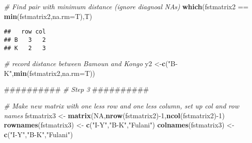 \documentclass[]{article}
\newenvironment{Shaded}{\begin{snugshade}}{\end{snugshade}}
\newcommand{\KeywordTok}[1]{\textcolor[rgb]{0.13,0.29,0.53}{\textbf{{#1}}}}
\newcommand{\DataTypeTok}[1]{\textcolor[rgb]{0.13,0.29,0.53}{{#1}}}
\newcommand{\DecValTok}[1]{\textcolor[rgb]{0.00,0.00,0.81}{{#1}}}
\newcommand{\StringTok}[1]{\textcolor[rgb]{0.31,0.60,0.02}{{#1}}}
\newcommand{\CommentTok}[1]{\textcolor[rgb]{0.56,0.35,0.01}{\textit{{#1}}}}
\newcommand{\OtherTok}[1]{\textcolor[rgb]{0.56,0.35,0.01}{{#1}}}
\newcommand{\NormalTok}[1]{{#1}}
\begin{document}
\begin{Shaded}
\begin{Highlighting}[]
\CommentTok{# Find pair with minimum distance (ignore diagnoal NAs)}
\KeywordTok{which}\NormalTok{(fstmatrix2 ==}\StringTok{ }\KeywordTok{min}\NormalTok{(fstmatrix2,}\DataTypeTok{na.rm=}\NormalTok{T),T)}
\end{Highlighting}
\end{Shaded}

\begin{verbatim}
##   row col
## B   3   2
## K   2   3
\end{verbatim}

\begin{Shaded}
\begin{Highlighting}[]
\CommentTok{# record distance between Bamoun and Kongo}
\NormalTok{y2 <-}\KeywordTok{c}\NormalTok{(}\StringTok{"B-K"}\NormalTok{,}\KeywordTok{min}\NormalTok{(fstmatrix2,}\DataTypeTok{na.rm=}\NormalTok{T))}

\NormalTok{##########}
\CommentTok{# Step 3}
\NormalTok{##########}

\CommentTok{# Make new matrix with one less row and one less column, set up col and row names}
\NormalTok{fstmatrix3 <-}\StringTok{ }\KeywordTok{matrix}\NormalTok{(}\OtherTok{NA}\NormalTok{,}\KeywordTok{nrow}\NormalTok{(fstmatrix2)-}\DecValTok{1}\NormalTok{,}\KeywordTok{ncol}\NormalTok{(fstmatrix2)-}\DecValTok{1}\NormalTok{)}
\KeywordTok{rownames}\NormalTok{(fstmatrix3) <-}\StringTok{ }\KeywordTok{c}\NormalTok{(}\StringTok{"I-Y"}\NormalTok{,}\StringTok{"B-K"}\NormalTok{,}\StringTok{"Fulani"}\NormalTok{)}
\KeywordTok{colnames}\NormalTok{(fstmatrix3) <-}\StringTok{ }\KeywordTok{c}\NormalTok{(}\StringTok{"I-Y"}\NormalTok{,}\StringTok{"B-K"}\NormalTok{,}\StringTok{"Fulani"}\NormalTok{)}


\end{Highlighting}
\end{Shaded}
\end{document}

